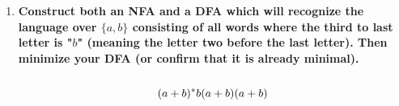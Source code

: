 \begin{enumerate}
\newpage
\item \textbf{Construct both an NFA and a DFA which will recognize the language over $\{a,b\}$ consisting of all words where the third to last letter is "$b$" (meaning the letter two before the last letter). Then minimize your DFA (or confirm that it is already minimal).}
\\\\
$$(a + b) {}^\ast b (a + b) (a + b)$$

\end{enumerate}



